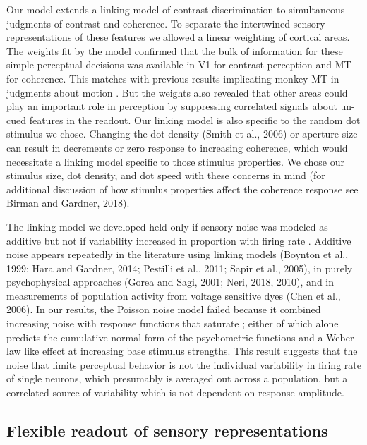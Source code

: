 \documentclass{report}
\begin{document}
Our model extends a linking model of contrast discrimination \citep{Boynton1999-jd} to simultaneous judgments of contrast and coherence. To separate the intertwined sensory representations of these features we allowed a linear weighting of cortical areas. The weights fit by the model confirmed that the bulk of information for these simple perceptual decisions was available in V1 for contrast perception and MT for coherence. This matches with previous results implicating monkey MT in judgments about motion \citep{Britten1996-ik,Katz2016-xc,Newsome1988-os}. But the weights also revealed that other areas could play an important role in perception by suppressing correlated signals about un-cued features in the readout. Our linking model is also specific to the random dot stimulus we chose. Changing the dot density (Smith et al., 2006) or aperture size \citep{Ajina2015-xm,Becker2008-uj,Costagli2014-kg} can result in decrements or zero response to increasing coherence, which would necessitate a linking model specific to those stimulus properties. We chose our stimulus size, dot density, and dot speed with these concerns in mind (for additional discussion of how stimulus properties affect the coherence response see Birman and Gardner, 2018).  

The linking model we developed held only if sensory noise was modeled as additive but not if variability increased in proportion with firing rate \citep{Softky1993-ki}. Additive noise appears repeatedly in the literature using linking models (Boynton et al., 1999; Hara and Gardner, 2014; Pestilli et al., 2011; Sapir et al., 2005), in purely psychophysical approaches (Gorea and Sagi, 2001; Neri, 2018, 2010), and in measurements of population activity from voltage sensitive dyes (Chen et al., 2006). In our results, the Poisson noise model failed because it combined increasing noise with response functions that saturate \citep{Birman2018-sp}; either of which alone predicts the cumulative normal form of the psychometric functions and a Weber-law like effect at increasing base stimulus strengths. This result suggests that the noise that limits perceptual behavior is not the individual variability in firing rate of single neurons, which presumably is averaged out across a population, but a correlated source of variability which is not dependent on response amplitude.

\subsection{Flexible readout of sensory representations}
\end{document}
